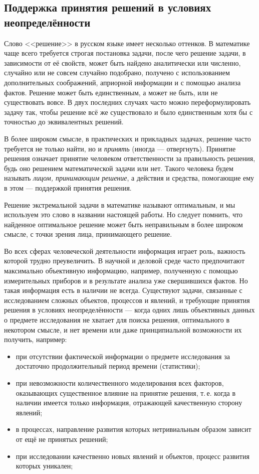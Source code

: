 
\subsection{Поддержка принятия решений в условиях неопределённости}
\label{sec:basic_intro}
Слово <<решение>> в русском языке имеет несколько оттенков. В математике чаще всего требуется строгая постановка задачи, после чего решение задачи, в зависимости от её свойств, может быть найдено аналитически или численно, случайно или не совсем случайно подобрано, получено с использованием дополнительных соображений,  априорной информации и с помощью анализа фактов. Решение может быть единственным, а может не быть, или не существовать вовсе. В двух последних случаях часто можно переформулировать задачу так, чтобы решение всё же существовало и было единственным хотя бы с точностью до эквивалентных решений. 

В более широком смысле, в практических и прикладных задачах, решение часто требуется не только найти, но и {\sl принять} (иногда --- отвергнуть). Принятие решения означает принятие человеком ответственности за правильность решения, будь оно решением математической задачи или нет. Такого человека будем называть {\sl лицом, принимающим решение}, а действия и средства, помогающие ему в этом ---  поддержкой принятия решения. 

Решение экстремальной задачи в математике называют оптимальным, и мы используем это слово в названии настоящей работы. Но следует помнить, что найденное оптимальное решение может быть неправильным в более широком смысле, с точки зрения лица, принимающего решение. 

Во всех сферах человеческой деятельности информация играет роль, важность которой трудно преувеличить. В научной и деловой среде часто предпочитают максимально объективную информацию, например, полученную с помощью измерительных приборов и в результате анализа уже свершившихся фактов. Но такая информация есть в наличии не всегда. Существуют задачи, связанные с исследованием сложных объектов, процессов и явлений, и требующие принятия решения в условиях неопределённости --- когда одних лишь объективных данных о предмете исследования не хватает для поиска решения, оптимального в некотором смысле, и нет времени или даже принципиальной возможности их  получить, например: 
\begin{itemize}
 \item при отсутствии фактической информации о предмете исследования за достаточно продолжительный период времени (статистики);
 \item при невозможности количественного моделирования всех факторов, оказывающих существенное влияние на принятие решения, т.\,е. когда в наличии имеется только информация, отражающей качественную сторону явлений; 
 \item в процессах, направление развития которых нетривиальным образом зависит от ещё не принятых решений;
 \item при исследовании качественно новых явлений и объектов, процесс развития которых уникален;
\end{itemize}

